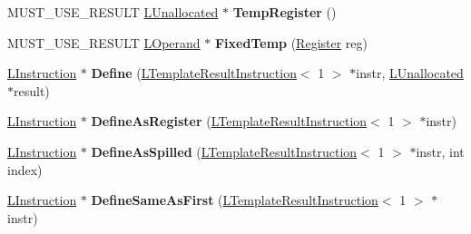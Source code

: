 \begin{DoxyCompactItemize}
\item 
M\+U\+S\+T\+\_\+\+U\+S\+E\+\_\+\+R\+E\+S\+U\+LT \hyperlink{classv8_1_1internal_1_1_l_unallocated}{L\+Unallocated} $\ast$ {\bfseries Temp\+Register} ()\hypertarget{classv8_1_1internal_1_1_l_chunk_builder_a4ba4ae71849e93fc59cb527dce3dbeea}{}\label{classv8_1_1internal_1_1_l_chunk_builder_a4ba4ae71849e93fc59cb527dce3dbeea}

\item 
M\+U\+S\+T\+\_\+\+U\+S\+E\+\_\+\+R\+E\+S\+U\+LT \hyperlink{classv8_1_1internal_1_1_l_operand}{L\+Operand} $\ast$ {\bfseries Fixed\+Temp} (\hyperlink{structv8_1_1internal_1_1_register}{Register} reg)\hypertarget{classv8_1_1internal_1_1_l_chunk_builder_a0e9a78fbc1b87c8a44c721e93143b26e}{}\label{classv8_1_1internal_1_1_l_chunk_builder_a0e9a78fbc1b87c8a44c721e93143b26e}

\item 
\hyperlink{classv8_1_1internal_1_1_l_instruction}{L\+Instruction} $\ast$ {\bfseries Define} (\hyperlink{classv8_1_1internal_1_1_l_template_result_instruction}{L\+Template\+Result\+Instruction}$<$ 1 $>$ $\ast$instr, \hyperlink{classv8_1_1internal_1_1_l_unallocated}{L\+Unallocated} $\ast$result)\hypertarget{classv8_1_1internal_1_1_l_chunk_builder_afd009a30c72fe37dd1b35d4241854ca0}{}\label{classv8_1_1internal_1_1_l_chunk_builder_afd009a30c72fe37dd1b35d4241854ca0}

\item 
\hyperlink{classv8_1_1internal_1_1_l_instruction}{L\+Instruction} $\ast$ {\bfseries Define\+As\+Register} (\hyperlink{classv8_1_1internal_1_1_l_template_result_instruction}{L\+Template\+Result\+Instruction}$<$ 1 $>$ $\ast$instr)\hypertarget{classv8_1_1internal_1_1_l_chunk_builder_af4f9a5078553b1f743899df249a25b31}{}\label{classv8_1_1internal_1_1_l_chunk_builder_af4f9a5078553b1f743899df249a25b31}

\item 
\hyperlink{classv8_1_1internal_1_1_l_instruction}{L\+Instruction} $\ast$ {\bfseries Define\+As\+Spilled} (\hyperlink{classv8_1_1internal_1_1_l_template_result_instruction}{L\+Template\+Result\+Instruction}$<$ 1 $>$ $\ast$instr, int index)\hypertarget{classv8_1_1internal_1_1_l_chunk_builder_a4e42c6b4bb935cc879f078e349ee6a1d}{}\label{classv8_1_1internal_1_1_l_chunk_builder_a4e42c6b4bb935cc879f078e349ee6a1d}

\item 
\hyperlink{classv8_1_1internal_1_1_l_instruction}{L\+Instruction} $\ast$ {\bfseries Define\+Same\+As\+First} (\hyperlink{classv8_1_1internal_1_1_l_template_result_instruction}{L\+Template\+Result\+Instruction}$<$ 1 $>$ $\ast$instr)\hypertarget{classv8_1_1internal_1_1_l_chunk_builder_a7a3e6bb64466e8d0b7062311bc13455a}{}\label{classv8_1_1internal_1_1_l_chunk_builder_a7a3e6bb64466e8d0b7062311bc13455a}


\end{DoxyCompactItemize}
